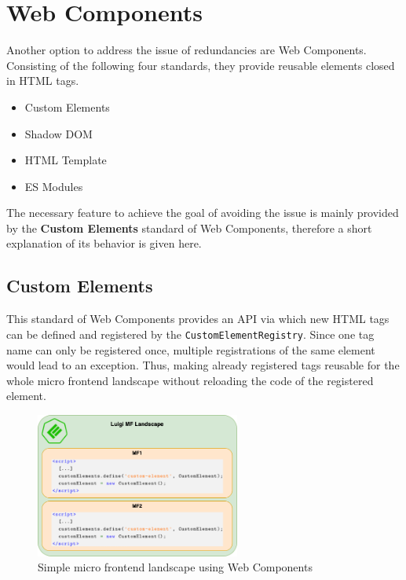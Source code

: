 \section{Web Components}

Another option to address the issue of redundancies are Web Components. Consisting of the following four standards, they provide reusable elements closed in HTML tags.\cite{mdn_web_docs}

\begin{itemize}[noitemsep]
	\item Custom Elements
	\item Shadow DOM
	\item HTML Template
	\item ES Modules
\end{itemize}


The necessary feature to achieve the goal of avoiding the issue is mainly provided by the \textbf{Custom Elements} standard of Web Components, therefore a short explanation of its behavior is given here.

\subsection{Custom Elements}

This standard of Web Components provides an API via which new HTML tags can be defined and registered by the \texttt{CustomElementRegistry}. Since one tag name can only be registered once, multiple registrations of the same element would lead to an exception. Thus, making already registered tags reusable for the whole micro frontend landscape without reloading the code of the registered element.\cite{google_reusable_wcs}

\begin{figure}[!h]
	\centering
	\includegraphics[width=0.6\textwidth]{Figures/customElements_registered.drawio.png}
	\caption{Simple micro frontend landscape using Web Components}
	\label{fig:same_wc_example}
\end{figure}

